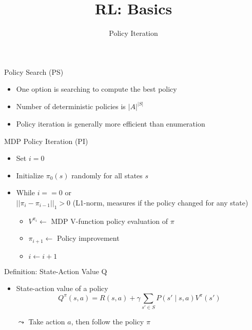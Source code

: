 \documentclass[aspectratio=169]{../latex_main/tntbeamer}  %
\title[Reinforcement Learning: Basics]{RL: Basics}
\subtitle{Policy Iteration}
\begin{document}
	
	\maketitle

\begin{frame}[c]{Policy Search (PS)}

\begin{itemize}
	\item One option is searching to compute the best policy
	\item Number of deterministic policies is $|A|^{|S|}$
	\item Policy iteration is generally more efficient than enumeration
\end{itemize}

\end{frame}
\begin{frame}[c]{MDP Policy Iteration (PI)}

\begin{itemize}
	\item Set $i=0$
	\item Initialize $\pi_0(s)$ randomly for all states $s$
	\item While $i == 0$ or\\ $||\pi_i - \pi_{i-1}||_1 > 0$ (L1-norm, measures if the policy changed for any state)
	\begin{itemize}
		\item $V^{\pi_i} \gets$ MDP V-function policy evaluation of $\pi$
		\item $\pi_{i+1} \gets$ Policy improvement
		\item $i \gets i+1$
	\end{itemize}
\end{itemize}

\end{frame}
\begin{frame}[c]{Definition: State-Action Value Q}

\begin{itemize}
	\item State-action value of a policy
	$$Q^\pi(s,a) = R(s,a) + \gamma \sum_{s' \in S} P(s' \mid s,a) V^\pi(s')$$
	\item[$\leadsto$] Take action $a$, then follow the policy $\pi$
\end{itemize}

\end{frame}
\end{document}
